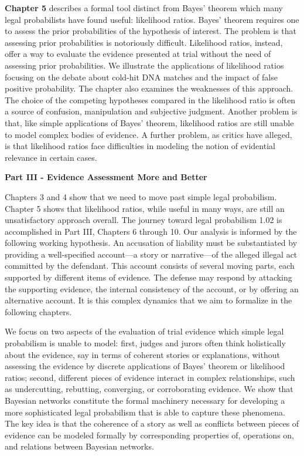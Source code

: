 \documentclass[
  10pt,
  dvipsnames,enabledeprecatedfontcommands]{scrartcl}
\begin{document}
\textbf{Chapter 5} describes a formal tool distinct from Bayes' theorem
which many legal probabilists have found useful: likelihood ratios.
Bayes' theorem requires one to assess the prior probabilities of the
hypothesis of interest. The problem is that assessing prior
probabilities is notoriously difficult. Likelihood ratios, instead,
offer a way to evaluate the evidence presented at trial without the need
of assessing prior probabilities. We illustrate the applications of
likelihood ratios focusing on the debate about cold-hit DNA matches and
the impact of false positive probability. The chapter also examines the
weaknesses of this approach. The choice of the competing hypotheses
compared in the likelihood ratio is often a source of confusion,
manipulation and subjective judgment. Another problem is that, like
simple applications of Bayes' theorem, likelihood ratios are still
unable to model complex bodies of evidence. A further problem, as
critics have alleged, is that likelihood ratios face difficulties in
modeling the notion of evidential relevance in certain cases.

\vspace{3mm}

\noindent \textbf{Part III - Evidence Assessment More and Better}

\noindent Chapters 3 and 4 show that we need to move past simple legal
probabilism. Chapter 5 shows that likelihood ratios, while useful in
many ways, are still an unsatisfactory approach overall. The journey
toward legal probabilism 1.02 is accomplished in Part III, Chapters 6
through 10. Our analysis is informed by the following working
hypothesis. An accusation of liability must be substantiated by
providing a well-specified account---a story or narrative---of the
alleged illegal act committed by the defendant. This account consists of
several moving parts, each supported by different items of evidence. The
defense may respond by attacking the supporting evidence, the internal
consistency of the account, or by offering an alternative account. It is
this complex dynamics that we aim to formalize in the following
chapters.

We focus on two aspects of the evaluation of trial evidence which simple
legal probabilism is unable to model: first, judges and jurors often
think holistically about the evidence, say in terms of coherent stories
or explanations, without assessing the evidence by discrete applications
of Bayes' theorem or likelihood ratios; second, different pieces of
evidence interact in complex relationships, such as undercutting,
rebutting, converging, or corroborating evidence. We show that Bayesian
networks constitute the formal machinery necessary for developing a more
sophisticated legal probabilism that is able to capture these phenomena.
The key idea is that the coherence of a story as well as conflicts
between pieces of evidence can be modeled formally by corresponding
properties of, operations on, and relations between Bayesian networks.
\end{document}
